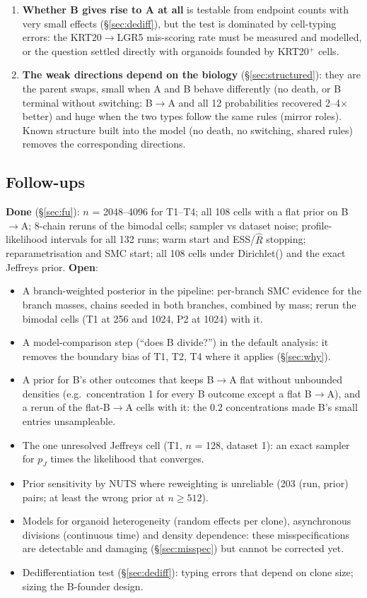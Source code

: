\documentclass[10pt,a4paper]{article}
\newcommand{\BA}{B$\to$A}
\begin{document}
\begin{enumerate}
\item \textbf{Whether B gives rise to A at all} is testable from endpoint counts with very small effects (\S\ref{sec:dediff}), but the test is dominated by cell-typing errors: the KRT20$\to$LGR5 mis-scoring rate must be measured and modelled, or the question settled directly with organoids founded by KRT20$^+$ cells.
\item \textbf{The weak directions depend on the biology} (\S\ref{sec:structured}): they are the parent swaps, small when A and B behave differently (no death, or B terminal without switching: \BA{} and all 12 probabilities recovered 2--4$\times$ better) and huge when the two types follow the same rules (mirror roles). Known structure built into the model (no death, no switching, shared rules) removes the corresponding directions.
\end{enumerate}

\subsection{Follow-ups}\label{sec:followups}
\textbf{Done} (\S\ref{sec:fu}): $n$ = 2048--4096 for T1--T4; all 108 cells with a flat prior on \BA; 8-chain reruns of the bimodal cells; sampler vs dataset noise; profile-likelihood intervals for all 132 runs; warm start and ESS/$\hat R$ stopping; reparametrisation and SMC start; all 108 cells under Dirichlet(\textonehalf) and the exact Jeffreys prior. \textbf{Open}:
\begin{itemize}
\item A branch-weighted posterior in the pipeline: per-branch SMC evidence for the branch masses, chains seeded in both branches, combined by mass; rerun the bimodal cells (T1 at 256 and 1024, P2 at 1024) with it.
\item A model-comparison step (``does B divide?'') in the default analysis: it removes the boundary bias of T1, T2, T4 where it applies (\S\ref{sec:why}).
\item A prior for B's other outcomes that keeps \BA{} flat without unbounded densities (e.g.\ concentration 1 for every B outcome except a flat \BA), and a rerun of the flat-\BA{} cells with it: the 0.2 concentrations made B's small entries unsampleable.
\item The one unresolved Jeffreys cell (T1, $n$ = 128, dataset 1): an exact sampler for $p_J$ times the likelihood that converges.
\item Prior sensitivity by NUTS where reweighting is unreliable (203 (run, prior) pairs; at least the wrong prior at $n \ge 512$).
\item Models for organoid heterogeneity (random effects per clone), asynchronous divisions (continuous time) and density dependence: these misspecifications are detectable and damaging (\S\ref{sec:misspec}) but cannot be corrected yet.
\item Dedifferentiation test (\S\ref{sec:dediff}): typing errors that depend on clone size; sizing the B-founder design.
\end{itemize}
\end{document}
